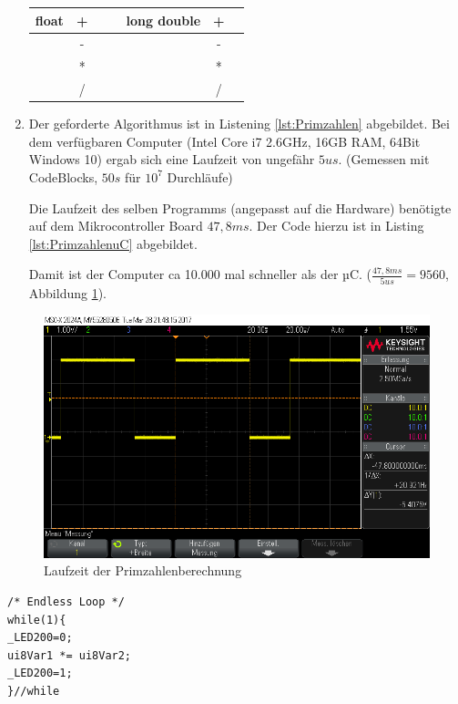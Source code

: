 \begin{enumerate}
\begin{tabular}{|c|c|c|c|c|c|c|}
	\hline 
	float 	& + &  &  				& long double 		& + &  \\ 
	\hline 
			& - &  &  		&  							& - &  \\ 
	\hline 
			& * &  &  		&  							& * &  \\ 
	\hline 
			& / &  &  		&  							& / &  \\ 
	\hline  
\end{tabular} 			
\newpage

		\item Der geforderte Algorithmus ist in Listening \ref{lst:Primzahlen} abgebildet. Bei dem verfügbaren Computer (Intel Core i7 2.6GHz, 16GB RAM, 64Bit Windows 10) ergab sich eine Laufzeit von ungefähr $5 us$. (Gemessen mit CodeBlocks, $50 s$ für $10^7$ Durchläufe)
		
		Die Laufzeit des selben Programms (angepasst auf die Hardware) benötigte auf dem Mikrocontroller Board $47,8 ms$. Der Code hierzu ist in Listing \ref{lst:PrimzahlenuC} abgebildet.
		
		Damit ist der Computer ca 10.000 mal schneller als der µC.
		 ($\frac{47,8 ms}{5 us} = 9560 $, Abbildung \ref{image:scopePrimzahlen}).
\end{enumerate}

\begin{figure}[h]
	\centering
	\includegraphics[width=\textwidth]{Images/scope_primzahlen}
	\caption[Laufzeit der Primzahlenberechnung]{Laufzeit der Primzahlenberechnung}
	\label{image:scopePrimzahlen}
\end{figure}

\newpage
\begin{lstlisting}[frame=htrbl, caption={Bestimmen der Rechenleistung}, label={lst:Rechenleistung}]
/* Endless Loop */
while(1){
_LED200=0;
ui8Var1 *= ui8Var2;
_LED200=1;
}//while
\end{lstlisting}

